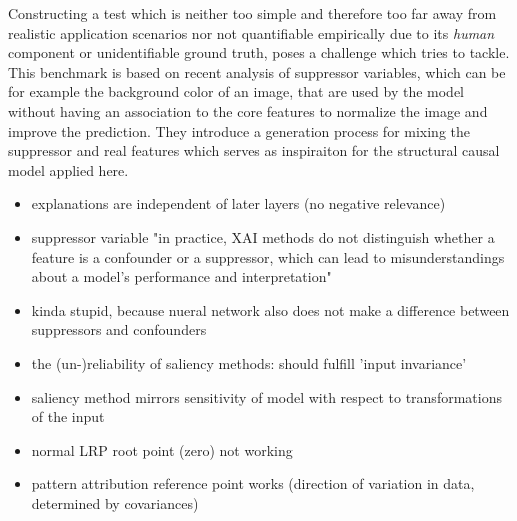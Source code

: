 Constructing a test which is neither too simple and therefore too far away from realistic application scenarios nor not quantifiable empirically due to its \textit{human} component or unidentifiable ground truth, poses a challenge which \cite{Clark2023} tries to tackle. This benchmark is based on recent analysis \cite{Wilming2023} of suppressor variables, which can be for example the background color of an image, that are used by the model without having an association to the core features to normalize the image and improve the prediction.
They introduce a generation process for mixing the suppressor and real features which serves as inspiraiton for the structural causal model applied here.

\begin{itemize}
      \item explanations are independent of later layers (no negative relevance) \cite{Sixt2020}
      \item suppressor variable "in practice, XAI methods do not distinguish whether a feature is a confounder or a suppressor, which can lead to misunderstandings about a model's performance and interpretation"
      \item kinda stupid, because nueral network also does not make a difference between suppressors and confounders \cite{Wilming2023}
      \item the (un-)reliability of saliency methods: should fulfill 'input invariance'
      \item saliency method mirrors sensitivity of model with respect to transformations of the input
      \item normal LRP root point (zero) not working
      \item pattern attribution reference point works (direction of variation in data, determined by covariances) \cite{Kindermans2019}
\end{itemize}


